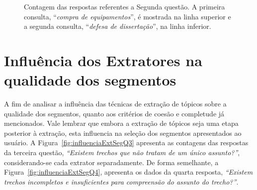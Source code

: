 \begin{figure}[!h]
{	}	

	\caption{Contagem das respostas referentes a Segunda questão. A primeira consulta, ``\textit{compra de equipamentos}'', é mostrada na linha superior e a segunda consulta, ``\textit{defesa de dissertação}'', na linha inferior.}
	\label{fig:c12-q2}
\end{figure}








\section{Influência dos Extratores na qualidade dos segmentos}

A fim de analisar a influência das técnicas de extração de tópicos sobre a qualidade dos segmentos, quanto aos critérios de coesão e completude já mencionados. Vale lembrar que embora a extração de tópicos seja uma etapa posterior à extração, esta influencia na seleção dos segmentos apresentados ao usuário. 
A Figura~\ref{fig:influenciaExtSegQ3} apresenta as contagens das respostas da terceira questão, \textit{``Existem trechos que não tratam de um único assunto?''}, considerando-se cada extrator separadamente. De forma semelhante, a Figura~\ref{fig:influenciaExtSegQ4}, apresenta os dados da quarta resposta, \textit{``Existem trechos incompletos e insuficientes para compreensão do assunto do trecho?''}.



